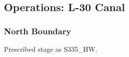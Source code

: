 %
%
%

\clearpage
\subsection{Operations: L-30 Canal}

\subsubsection{North Boundary}
Prescribed stage as S335\_HW.



